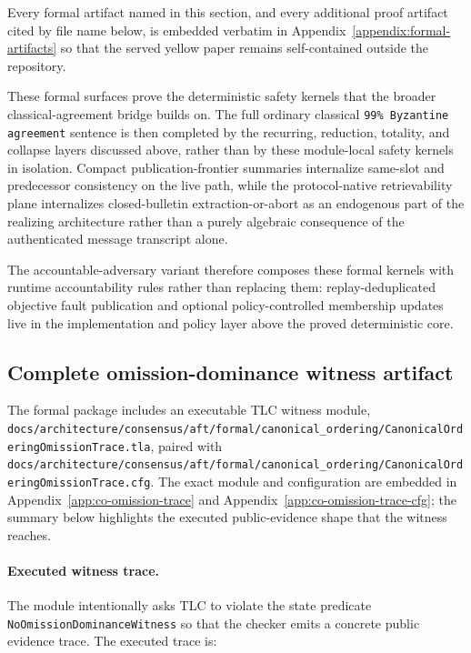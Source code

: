 \documentclass[11pt]{article}
\newcommand{\code}[1]{\texttt{#1}}
\begin{document}
Every formal artifact named in this section, and every additional proof
artifact cited by file name below, is embedded verbatim in
Appendix~\ref{appendix:formal-artifacts} so that the served yellow paper
remains self-contained outside the repository.

These formal surfaces prove the deterministic safety kernels that the broader
classical-agreement bridge builds on. The full ordinary classical
\code{99\% Byzantine agreement} sentence is then completed by the recurring,
reduction, totality, and collapse layers discussed above, rather than by these
module-local safety kernels in isolation. Compact publication-frontier
summaries internalize same-slot and predecessor consistency on the live path,
while the protocol-native retrievability plane internalizes closed-bulletin
extraction-or-abort as an endogenous part of the realizing architecture rather
than a purely algebraic consequence of the authenticated message transcript
alone.

The accountable-adversary variant therefore composes these formal kernels with
runtime accountability rules rather than replacing them: replay-deduplicated
objective fault publication and optional policy-controlled membership updates
live in the implementation and policy layer above the proved
deterministic core.

\subsection{Complete omission-dominance witness artifact}

The formal package includes an executable TLC witness module,
\code{docs/architecture/consensus/aft/formal/canonical\_ordering/CanonicalOrderingOmissionTrace.tla},
paired with
\code{docs/architecture/consensus/aft/formal/canonical\_ordering/CanonicalOrderingOmissionTrace.cfg}.
The exact module and configuration are embedded in
Appendix~\ref{app:co-omission-trace} and
Appendix~\ref{app:co-omission-trace-cfg}; the summary below highlights the
executed public-evidence shape that the witness reaches.

\paragraph{Executed witness trace.}
The module intentionally asks TLC to violate the state predicate
\code{NoOmissionDominanceWitness} so that the checker emits a concrete public
evidence trace. The executed trace is:
\end{document}
